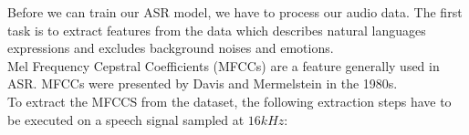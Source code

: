 

Before we can train our ASR model, we have to process our audio data. The first
task is to extract features from the data which describes natural languages
expressions and excludes background noises and emotions.\\


Mel Frequency Cepstral Coefficients (MFCCs) are a feature generally used in ASR.
MFCCs were presented by Davis and Mermelstein in the 1980s.~\cite{mfcc}\\

To extract the MFCCS from the dataset, the following extraction steps have to be
executed on a speech signal sampled at $16kHz$:\\

